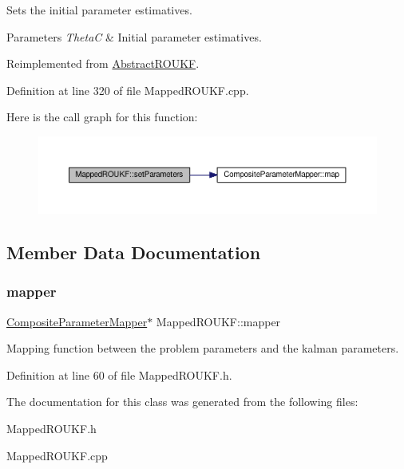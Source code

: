Sets the initial parameter estimatives. 
\begin{DoxyParams}{Parameters}
{\em ThetaC} & Initial parameter estimatives. \\
\hline
\end{DoxyParams}


Reimplemented from \mbox{\hyperlink{classAbstractROUKF_a8e8f7c34007a2363530f7cca4cfb0c9f}{Abstract\+R\+O\+U\+KF}}.



Definition at line 320 of file Mapped\+R\+O\+U\+K\+F.\+cpp.

Here is the call graph for this function\+:\nopagebreak
\begin{figure}[H]
\begin{center}
\leavevmode
\includegraphics[width=350pt]{classMappedROUKF_a4d3a109dc95812c8d9c6ac2a489349c2_cgraph}
\end{center}
\end{figure}


\subsection{Member Data Documentation}
\mbox{\label{classMappedROUKF_a5177d0749fa9a6ce81d760267f4e7e09}} 
\subsubsection{\texorpdfstring{mapper}{mapper}}
{\footnotesize\ttfamily \mbox{\hyperlink{classCompositeParameterMapper}{Composite\+Parameter\+Mapper}}$\ast$ Mapped\+R\+O\+U\+K\+F\+::mapper\hspace{0.3cm}{\ttfamily [private]}}

Mapping function between the problem parameters and the kalman parameters. 

Definition at line 60 of file Mapped\+R\+O\+U\+K\+F.\+h.



The documentation for this class was generated from the following files\+:\begin{DoxyCompactItemize}
\item 
Mapped\+R\+O\+U\+K\+F.\+h\item 
Mapped\+R\+O\+U\+K\+F.\+cpp\end{DoxyCompactItemize}
